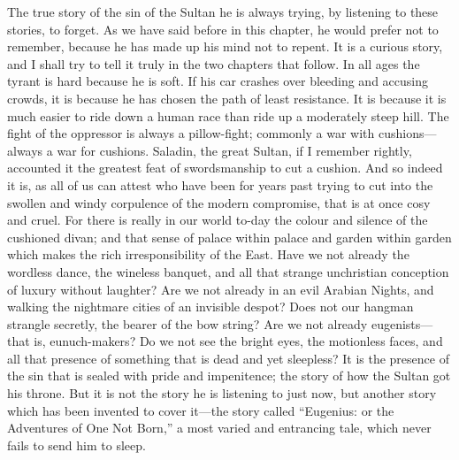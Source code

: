 \documentclass{book}
\begin{document}
The true story of the sin of the Sultan he is always trying, by listening to these stories, to forget. As we have said before in this chapter, he would prefer not to remember, because he has made up his mind not to repent. It is a curious story, and I shall try to tell it truly in the two chapters that follow. In all ages the tyrant is hard because he is soft. If his car crashes over bleeding and accusing crowds, it is because he has chosen the path of least resistance. It is because it is much easier to ride down a human race than ride up a moderately steep hill. The fight of the oppressor is always a pillow-fight; commonly a war with cushions—always a war for cushions. Saladin, the great Sultan, if I remember rightly, accounted it the greatest feat of swordsmanship to cut a cushion. And so indeed it is, as all of us can attest who have been for years past trying to cut into the swollen and windy corpulence of the modern compromise, that is at once cosy and cruel. For there is really in our world to-day the colour and silence of the cushioned divan; and that sense of palace within palace and garden within garden which makes the rich irresponsibility of the East. Have we not already the wordless dance, the wineless banquet, and all that strange unchristian conception of luxury without laughter? Are we not already in an evil Arabian Nights, and walking the nightmare cities of an invisible despot? Does not our hangman strangle secretly, the bearer of the bow string? Are we not already eugenists—that is, eunuch-makers? Do we not see the bright eyes, the motionless faces, and all that presence of something that is dead and yet sleepless? It is the presence of the sin that is sealed with pride and impenitence; the story of how the Sultan got his throne. But it is not the story he is listening to just now, but another story which has been invented to cover it—the story called “Eugenius: or the Adventures of One Not Born,” a most varied and entrancing tale, which never fails to send him to sleep.
\end{document}
